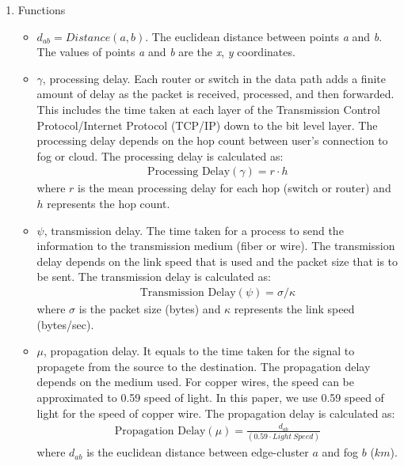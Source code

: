 \documentclass[10pt,journal,compsoc]{IEEEtran}
\begin{document}
\begin{enumerate}
\item Functions
\begin{itemize}
\item $d_{ab} = Distance (\textit{a}, \textit{b})$. The euclidean distance between points \textit{a} and \textit{b}. The values of points \textit{a} and \textit{b} are the \textit{x}, \textit{y} coordinates.
\item $\gamma$, processing delay. Each router or switch in the data path adds a finite amount of delay as the packet is received, processed, and then forwarded. This includes the time taken at each layer of the Transmission Control Protocol/Internet Protocol (TCP/IP) down to the bit level layer. The processing delay depends on the hop count between user's connection to fog or cloud. The processing delay is calculated as: 
\begin{align}
\text{Processing Delay} (\gamma) = r \cdot h %
\end{align}
where $r$ is the mean processing delay for each hop (switch or router) and $h$ represents the hop count.
\item $\psi$, transmission delay. The time taken for a process to send the information to the transmission medium (fiber or wire). The transmission delay depends on the link speed that is used and the packet size that is to be sent. The transmission delay is calculated as: 
\begin{align}
\text{Transmission Delay} (\psi) =\sigma / \kappa
\end{align}
where $\sigma$ is the packet size (bytes) and $\kappa$ represents the link speed (bytes/sec).
\item  $\mu$, propagation delay. It equals to the time taken for the signal to propagete from the source to the destination. The propagation delay depends on the medium used. For copper wires, the speed can be approximated to 0.59 speed of light. In this paper, we use 0.59 speed of light for the speed of copper wire. The propagation delay is calculated as:  
\begin{align}
\text{Propagation Delay} (\mu) = \frac{d_{ab}}{(0.59 \cdot Light\ Speed)}
\end{align}
where $d_{ab}$ is the euclidean distance between edge-cluster $a$ and fog $b$ ($km$). 


\end{itemize}
\end{enumerate}
\end{document}
